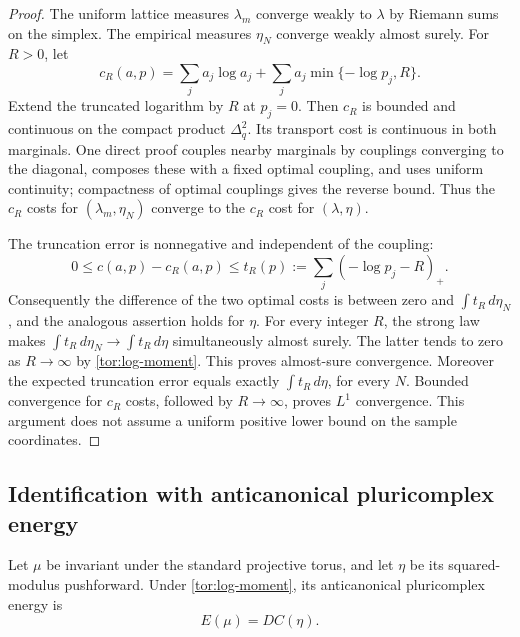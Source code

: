 \begin{proof}
The uniform lattice measures $\lambda_m$ converge weakly to $\lambda$
by Riemann sums on the simplex. The empirical measures $\eta_N$
converge weakly almost surely. For $R>0$, let
\[
 c_R(a,p)=\sum_j a_j\log a_j+
                  \sum_j a_j\min\{-\log p_j,R\}.
\]
Extend the truncated logarithm by $R$ at $p_j=0$. Then $c_R$ is
bounded and continuous on the compact product $\Delta_q^2$.
Its transport cost is continuous in both marginals. One direct proof
couples nearby marginals by couplings converging to the diagonal,
composes these with a fixed optimal coupling, and uses uniform
continuity; compactness of optimal couplings gives the reverse bound.
Thus the $c_R$ costs for $(\lambda_m,\eta_N)$ converge to the $c_R$
cost for $(\lambda,\eta)$.

The truncation error is nonnegative and independent of the coupling:
\[
 0\le c(a,p)-c_R(a,p)
 \le t_R(p):=\sum_j(-\log p_j-R)_+.
\]
Consequently the difference of the two optimal costs is between zero
and $\int t_R\,d\eta_N$, and the analogous assertion holds for
$\eta$. For every integer $R$, the strong law makes
$\int t_R\,d\eta_N\to\int t_R\,d\eta$ simultaneously almost surely.
The latter tends to zero as $R\to\infty$ by
\eqref{tor:log-moment}. This proves almost-sure convergence.
Moreover the expected truncation error equals exactly
$\int t_R\,d\eta$, for every $N$. Bounded convergence for $c_R$ costs,
followed by $R\to\infty$, proves $L^1$ convergence. This argument does
not assume a uniform positive lower bound on the sample coordinates.
\end{proof}

\subsection{Identification with anticanonical pluricomplex energy}

\begin{proposition}
\label{tor:energy-transport}
Let $\mu$ be invariant under the standard projective torus, and let
$\eta$ be its squared-modulus pushforward. Under
\eqref{tor:log-moment}, its anticanonical pluricomplex energy is
\begin{equation}
 E(\mu)=D C(\eta).
 \label{tor:energy-transport-formula}
\end{equation}
\end{proposition}

